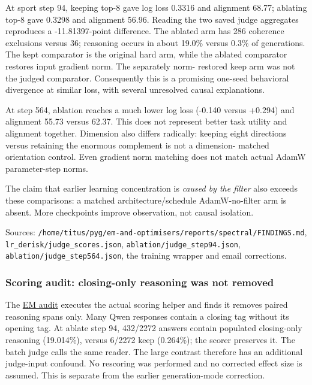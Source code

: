 \documentclass[
  british,
  10pt,
  a4paper,
]{article}
\begin{document}
At sport step 94, keeping top-8 gave log loss 0.3316 and alignment
68.77; ablating top-8 gave 0.3298 and alignment 56.96. Reading the two
saved judge aggregates reproduces a
-\allowbreak{}11.\allowbreak{}81397-\allowbreak{}point
difference.\allowbreak{} The ablated arm has 286 coherence exclusions
versus 36; reasoning occurs in about 19.0\% versus 0.3\% of
generations.\allowbreak{} The kept comparator is the original hard arm,
while the ablated comparator restores input gradient norm. The
separately norm- restored keep arm was not the judged
comparator.\allowbreak{} Consequently this is a promising one-seed
behavioral divergence at similar loss, with several unresolved causal
explanations\allowbreak{}.\allowbreak{}

At step 564, ablation reaches a much lower log loss (-0.140 versus
+0.294) and alignment 55.73 versus 62.37. This does not represent better
task utility and alignment together. Dimension also differs radically:
keeping eight directions versus retaining the enormous complement is not
a dimension- matched orientation control. Even gradient norm matching
does not match actual AdamW parameter-\allowbreak{}step norms.

The claim that earlier learning concentration is \emph{caused by the
filter} also exceeds these comparisons: a matched
architecture\allowbreak{}/\allowbreak{}schedule
AdamW-\allowbreak{}no-\allowbreak{}filter arm is absent. More
checkpoints improve observation,\allowbreak{} not causal isolation.

Sources:
\texttt{/\allowbreak{}home/\allowbreak{}titus/\allowbreak{}pyg/\allowbreak{}em-\allowbreak{}and-\allowbreak{}optimisers/\allowbreak{}reports/\allowbreak{}spectral/\allowbreak{}FINDINGS.\allowbreak{}md},
\texttt{lr\_\allowbreak{}derisk/\allowbreak{}judge\_\allowbreak{}scores.\allowbreak{}json},
\texttt{ablation/\allowbreak{}judge\_\allowbreak{}step94.\allowbreak{}json},
\texttt{ablation/\allowbreak{}judge\_\allowbreak{}step564.\allowbreak{}json},
the training wrapper and email corrections.\allowbreak{}

\subsubsection{\texorpdfstring{Scoring audit: closing-\allowbreak{}only
reasoning was not
removed}{Scoring audit:  reasoning was not removed}}\label{external-studies--scoring-audit-closing-only-reasoning-was-not-removed}

The \hyperref[em-results-audit]{EM audit} executes the actual scoring
helper and finds it removes paired reasoning spans only. Many Qwen
responses contain a closing tag without its opening tag. At ablate step
94, 432/2272 answers contain populated closing-\allowbreak{}only
reasoning (19.014\%), versus 6/2272 keep (0.264\%); the scorer preserves
it. The batch judge calls the same reader. The large contrast therefore
has an additional judge-\allowbreak{}input confound. No rescoring was
performed and no corrected effect size is assumed. This is separate from
the earlier generation-\allowbreak{}mode correction.\allowbreak{}
\end{document}
